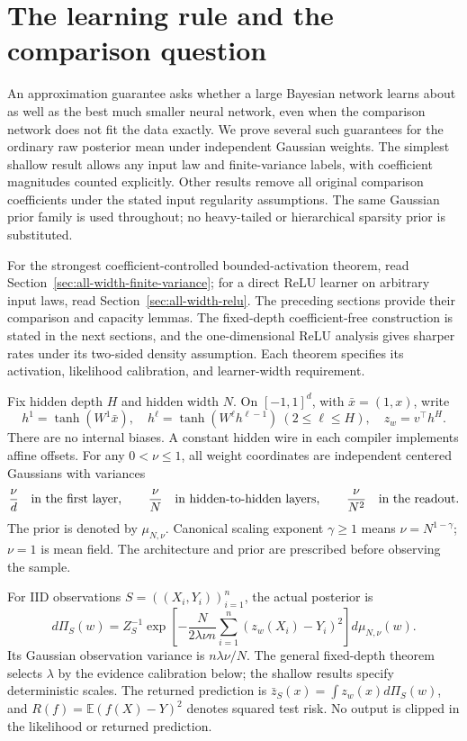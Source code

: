 \documentclass[11pt]{article}
\theoremstyle{remark}\newtheorem{remark}[theorem]{Remark}
\newcommand{\E}{\mathbb E}\newcommand{\R}{\mathbb R}
\begin{document}
\section{The learning rule and the comparison question}
\label{sec:model}
An approximation guarantee asks whether a large Bayesian network
learns about as well as the best much smaller neural network, even when
the comparison network does not fit the data exactly. We prove several
such guarantees for the ordinary raw posterior mean under independent
Gaussian weights. The simplest shallow result allows any input law and
finite-variance labels, with coefficient magnitudes counted explicitly.
Other results remove all original comparison coefficients under the
stated input regularity assumptions. The same Gaussian prior family is
used throughout; no heavy-tailed or hierarchical sparsity prior is
substituted.

For the strongest coefficient-controlled bounded-activation theorem,
read Section~\ref{sec:all-width-finite-variance}; for a direct ReLU
learner on arbitrary input laws, read Section~\ref{sec:all-width-relu}.
The preceding sections provide their comparison and capacity lemmas.
The fixed-depth coefficient-free construction is stated in the next
sections, and the one-dimensional ReLU analysis gives sharper rates
under its two-sided density assumption. Each theorem specifies its
activation, likelihood calibration, and learner-width requirement.

Fix hidden depth $H$ and hidden width $N$. On $[-1,1]^d$, with
$\bar x=(1,x)$, write
\[
 h^1=\tanh(W^1\bar x),\quad
 h^\ell=\tanh(W^\ell h^{\ell-1})\ (2\le\ell\le H),\quad
 z_w=v^\top h^H.
\]
There are no internal biases. A constant hidden wire in each compiler
implements affine offsets. For any $0<\nu\le1$, all weight coordinates
are independent centered Gaussians with variances
\[
 \frac\nu d\quad\hbox{in the first layer},\qquad
 \frac\nu N\quad\hbox{in hidden-to-hidden layers},\qquad
 \frac\nu{N^2}\quad\hbox{in the readout}.
\]
The prior is denoted by $\mu_{N,\nu}$. Canonical scaling exponent
$\gamma\ge1$ means $\nu=N^{1-\gamma}$; $\nu=1$ is mean field.
The architecture and prior are prescribed before observing the sample.

For IID observations $S=((X_i,Y_i))_{i=1}^n$, the actual posterior is
\begin{equation}
 d\Pi_S(w)=Z_S^{-1}
 \exp\left[-\frac N{2\lambda\nu n}
                  \sum_{i=1}^n(z_w(X_i)-Y_i)^2\right]d\mu_{N,\nu}(w).
 \label{eq:actual-posterior}
\end{equation}
Its Gaussian observation variance is $n\lambda\nu/N$. The general fixed-depth theorem selects $\lambda$ by the evidence
calibration below; the shallow results specify deterministic scales. The returned
prediction is $\bar z_S(x)=\int z_w(x)d\Pi_S(w)$, and
$R(f)=\E(f(X)-Y)^2$ denotes squared test risk. No output is clipped
in the likelihood or returned prediction.
\end{document}
